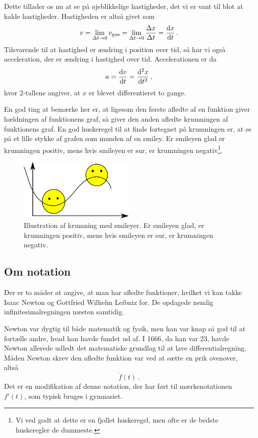 Dette tillader os nu at se på øjeblikkelige hastigheder, det vi er vant til blot at kalde hastigheder. Hastigheden er altså givet som
\begin{equation}
v=\lim_{\Delta t\rightarrow 0}v_\text{gns}= \lim_{\Delta t\rightarrow 0} \frac{\Delta x}{\Delta t} = \dv{x}{t}\label{mat:eq:hast} \, .
\end{equation}
Tilsvarende til at hastighed er ændring i position over tid, så har vi også acceleration, der er ændring i hastighed over tid. Accelerationen er da 
\begin{equation}
    a=\dv{v}{t}=\dv[2]{x}{t} \, ,
\end{equation}
hvor 2-tallene angiver, at $x$ er blevet differentieret to gange.

En god ting at bemærke her er, at ligesom den første afledte af en funktion giver hældningen af funktionens graf, så giver den anden afledte krumningen af funktionens graf.
En god huskeregel til at finde fortegnet på krumningen er, at se på et lille stykke af grafen som munden af en smiley. Er smileyen glad er krumningen positiv, mens hvis smileyen er sur, er krumningen negativ\footnote{Vi ved godt at dette er en fjollet huskeregel, men ofte er de bedste huskeregler de dummeste.}.
\begin{figure}
    \centering
    \includegraphics[width = 0.5\textwidth]{Mat/matfig/smiley.pdf}
    \caption{Illustration af krumning med smileyer. Er smileyen glad, er krumningen positiv, mens hvis smileyen er sur, er krumningen negativ.}
    \label{fig:my_label}
\end{figure}

\subsection{Om notation}
Der er to måder at angive, at man har afledte funktioner, hvilket vi kan takke Isaac  Newton og Gottfried Wilhelm Leibniz for. De opdagede nemlig infinitesimalregningen næsten samtidig.

Newton var dygtig til både matematik og fysik, men han var knap så god til at fortælle andre, hvad han havde fundet ud af. I 1666, da han var 23, havde Newton allerede udledt det matematiske grundlag til at lave differentialregning. Måden Newton skrev den afledte funktion var ved at sætte en prik ovenover, altså
$$
\dot{f}(t) \, .
$$
Det er en modifikation af denne notation, der har ført til mærkenotationen $f'(t)$, som typisk bruges i gymnasiet.

